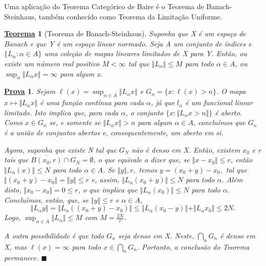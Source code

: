 \documentclass{article}
\newtheorem*{theorem*}{\underline{Teorema}}
\newtheorem*{proof*}{\underline{Prova}}
\renewcommand\qedsymbol{$\blacksquare$}
\begin{document}
  Uma aplicação do Teorema Categórico de Baire é o Teorema de Banach-Steinhaus, também conhecido como Teorema da Limitação Uniforme.
  \hypertarget{banach_steinhauss}{
    \begin{theorem*}[Teorema de Banach-Steinhaus]
      Suponha que X é um espaço de Banach e que Y é um espaço linear normado. Seja A um conjunto de índices e \(\{L_{\alpha }: \alpha \in A \}\) uma coleção de mapas lineares limitados de X para Y. Então, ou existe 
um número real positivo \(M<\infty\) tal que \(\Vert L_{\alpha } \Vert\leq M\) para todo \(\alpha \in A\), ou \(\sup_{\alpha }\Vert L_{\alpha }x \Vert = \infty\) para algum x.
   \end{theorem*}
  }
 \begin{proof*}
   Sejam \(\ell (x) = \sup_{\alpha \in A}\Vert L_{\alpha }x \Vert\) e \(G_{n} = \{x:\ell (x) > n\}\). O mapa \(x\mapsto \Vert L_{\alpha }x \Vert\) é uma função contínua para cada \(\alpha \), já que \(l_{\alpha }\) é um funcional linear limitado. Isto implica que, para cada \(\alpha \), o conjunto 
   \(\{x: \Vert L_{\alpha }x > n\Vert\}\) é aberto. Como \(x\in G_{n}\) se, e somente se \(\Vert L_{\alpha }x \Vert > n\) para algum \(\alpha \in A\), concluímos que \(G_{n}\) é a união de conjuntos abertos e, consequentemente, um aberto em si. 

   Agora, suponha que existe N tal que \(G_{N}\) não é denso em X. Então, existem \(x_{0}\) e r tais que \(\overline{B(x_{0}, r)}\cap G_{N} = \emptyset \), o que equivale a dizer que, se \(\Vert x-x_{0} \Vert\leq r\), então \(\Vert L_{\alpha }(x) \Vert\leq N\) para todo \(\alpha \in A\). 
  Se \(\Vert y \Vert, r,\) temos \(y=(x_{0}+y) - x_{0},\) tal que \(\Vert (x_{0}+y) - x_{0} \Vert = \Vert y \Vert\leq r\) e, assim, \(\Vert L_{\alpha }(x_{0} + y) \Vert\leq N\) para todo \(\alpha \). Além disto, \(\Vert x_{0}-x_{0} \Vert = 0 \leq r\), o que implica que \(\Vert L_{\alpha }(x_{0}) \Vert\leq N\) para todo \(\alpha \). 
  Concluímos, então, que, se \(\Vert y \Vert\leq r\) e \(\alpha \in A\),
    \[
      \Vert L_{\alpha }y \Vert = \Vert L_{\alpha }((x_{0}+y) - x_{0}) \Vert\leq \Vert L_{\alpha }(x_{0}-y) \Vert + \Vert L_{\alpha }x_{0} \Vert\leq 2N.
    \]
  Logo, \(\sup_{\alpha \in A}\Vert L_{\alpha } \Vert\leq M\) com \(M = \frac{2N}{r}\).

  A outra possibilidade é que todo \(G_{n}\) seja denso em X. Neste, \(\bigcap_{n}^{}G_{n}\) é denso em X, mas \(\ell (x) = \infty\) para todo \(x\in \bigcap_{n}^{}G_{n}\). Portanto, a conclusão do Teorema permanece. \qedsymbol
 \end{proof*}
\end{document}
